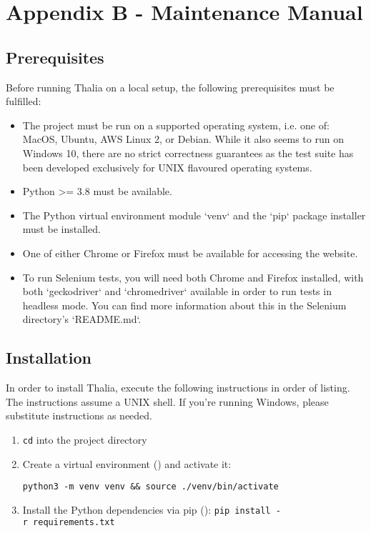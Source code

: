 \documentclass[main.tex]{subfiles}
\begin{document}
\section{Appendix B - Maintenance Manual}
\label{maintance-manual}
\label{MaintenanceManual}

\subsection{Prerequisites}
\label{prerequisits-for-running-thalia}

Before running Thalia on a local setup, the following prerequisites must be fulfilled:

\begin{itemize}
\item
  The project must be run on a supported operating system, i.e. one of: MacOS, Ubuntu, AWS Linux 2, or Debian. While it also seems to run on Windows 10, there are no strict correctness guarantees as the test suite has been developed exclusively for UNIX flavoured operating systems.
\item
  Python \textgreater= 3.8 must be available.
\item
  The Python virtual environment module `venv` and the `pip` package installer must be installed.
\item
  One of either Chrome or Firefox must be available for accessing the website.
\item
  To run Selenium tests, you will need both Chrome and Firefox installed, with both `geckodriver` and `chromedriver` available in order to run tests in headless mode.
  You can find more information about this in the Selenium directory's `README.md`.
\end{itemize}

\subsection{Installation}
\label{installation-instructions}

In order to install Thalia, execute the following instructions in order of listing. The instructions assume a UNIX shell. If you're running Windows, please substitute instructions as needed.

\begin{enumerate}

\item
  \texttt{cd} into the project directory
\item
  Create a virtual environment () and activate it: \newline
  
  \texttt{python3\ -m\ venv\ venv\ \&\&\ source\ ./venv/bin/activate}
\item Install the Python dependencies via pip
():
\newline
  \texttt{pip\ install\ -r\ requirements.txt}
\end{enumerate}
\end{document}
